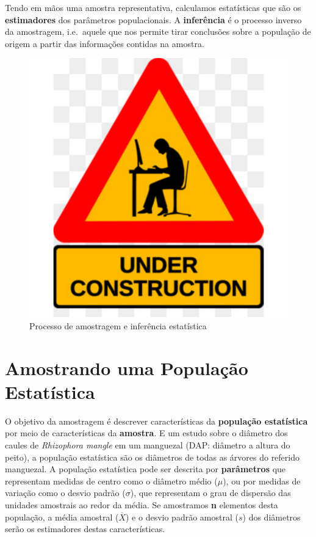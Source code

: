 \documentclass[
]{book}
\begin{document}
Tendo em mãos uma amostra representativa, calculamos estatísticas que são os \textbf{estimadores} dos parâmetros populacionais. A \textbf{inferência} é o processo inverso da amostragem, i.e.~aquele que nos permite tirar conclusões sobre a população de origem a partir das informações contidas na amostra.

\begin{figure}

{\centering \includegraphics[width=18in]{probest-cambientais_files/figure-latex/unnamed-chunk-235-1} 

}

\caption{Processo de amostragem e inferência estatística}\label{fig:unnamed-chunk-235}
\end{figure}

\hypertarget{amostrmedias}{%
\chapter{Amostrando uma População Estatística}\label{amostrmedias}}

O objetivo da amostragem é descrever características da \textbf{população estatística} por meio de características da \textbf{amostra}. E um estudo sobre o diâmetro dos caules de \emph{Rhizophora mangle} em um manguezal (DAP: diâmetro a altura do peito), a população estatística são os diâmetros de todas as árvores do referido manguezal. A população estatística pode ser descrita por \textbf{parâmetros} que representam medidas de centro como o diâmetro médio (\(\mu\)), ou por medidas de variação como o desvio padrão (\(\sigma\)), que representam o grau de dispersão das unidades amostrais ao redor da média. Se amostramos \textbf{n} elementos desta população, a média amostral (\(\overline{X}\)) e o desvio padrão amostral (\(s\)) dos diâmetros serão os estimadores destas características.
\end{document}
